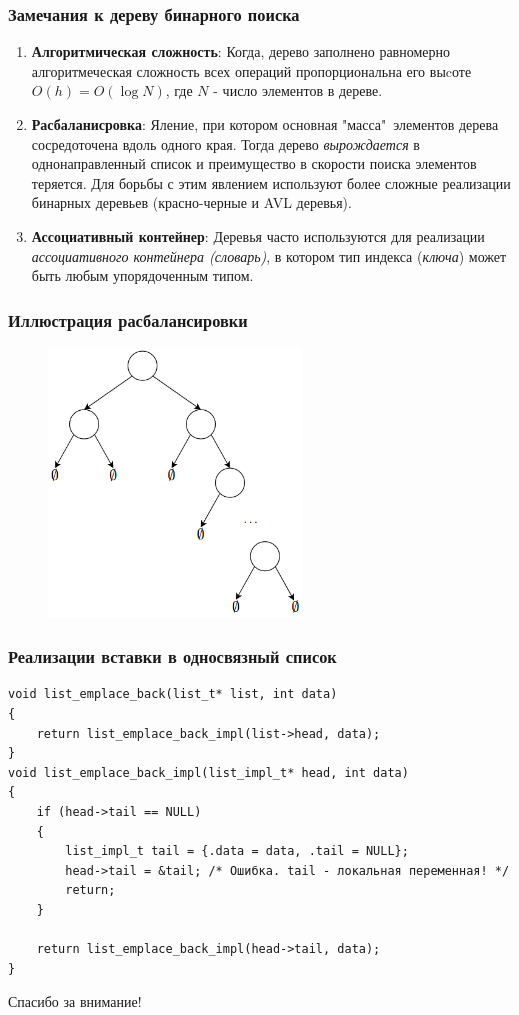 \documentclass{beamer}
\begin{document}
    \begin{frame}[fragile]
        \frametitle{Замечания к дереву бинарного поиска}
        \begin{enumerate}
            \justifying
            \item {\bf Алгоритмическая сложность}:
            Когда, дерево заполнено равномерно алгоритмеческая сложность всех операций пропорциональна его выcоте $O(h) = O(\log N)$, где $N$ - число элементов в дереве.
            \item {\bf Расбаланисровка}:
            Яление, при котором основная "масса"\ элементов дерева сосредоточена вдоль одного края. Тогда дерево {\it вырождается} в однонаправленный список и преимущество в скорости поиска элементов теряется. Для борьбы с этим явлением используют более сложные реализации бинарных деревьев (красно-черные и AVL деревья).
            \item {\bf Ассоциативный контейнер}:
            Деревья часто используются для реализации {\it ассоциативного контейнера (словарь)}, в котором тип индекса ({\it ключа}) может быть любым упорядоченным типом.
        \end{enumerate}
    \end{frame}
    \begin{frame}[fragile]
        \frametitle{Иллюстрация расбалансировки}
        \begin{figure}[!tbp]
           \centering
           \includegraphics[width=0.6\textwidth]{pics/inbalance.png}
        \end{figure}
    \end{frame}
    \begin{frame}[fragile]
        \frametitle{Реализации вставки в односвязный список}
        \begin{verbatim}
void list_emplace_back(list_t* list, int data)
{
    return list_emplace_back_impl(list->head, data);
}
void list_emplace_back_impl(list_impl_t* head, int data)
{
    if (head->tail == NULL)
    {
        list_impl_t tail = {.data = data, .tail = NULL};
        head->tail = &tail; /* Ошибка. tail - локальная переменная! */
        return;
    }

    return list_emplace_back_impl(head->tail, data);
}
        \end{verbatim}
    \end{frame}
    \begin{frame}
        \begin{center}
        \baselineskip 20.0mm
        \Huge Спасибо за внимание!
        \end{center}
    \end{frame}
\end{document}
